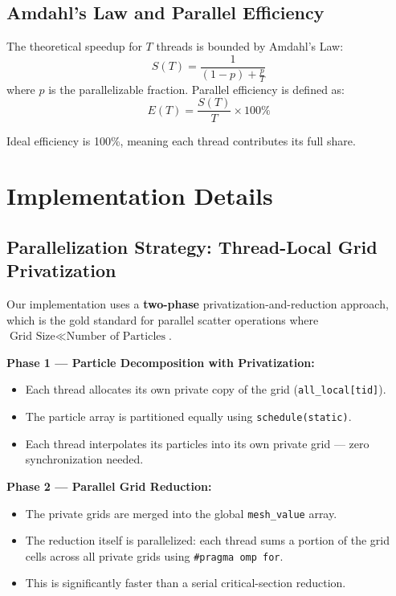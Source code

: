 \documentclass[12pt,a4paper]{article}
\begin{document}
\subsection{Amdahl's Law and Parallel Efficiency}

The theoretical speedup for $T$ threads is bounded by Amdahl's Law:
\[
S(T) = \frac{1}{(1-p) + \frac{p}{T}}
\]
where $p$ is the parallelizable fraction. Parallel efficiency is defined as:
\[
E(T) = \frac{S(T)}{T} \times 100\%
\]

Ideal efficiency is 100\%, meaning each thread contributes its full share.

\section{Implementation Details}

\subsection{Parallelization Strategy: Thread-Local Grid Privatization}

Our implementation uses a \textbf{two-phase} privatization-and-reduction approach, which is the gold standard for parallel scatter operations where $\text{Grid Size} \ll \text{Number of Particles}$.

\textbf{Phase 1 --- Particle Decomposition with Privatization:}
\begin{itemize}
    \item Each thread allocates its own private copy of the grid (\texttt{all\_local[tid]}).
    \item The particle array is partitioned equally using \texttt{schedule(static)}.
    \item Each thread interpolates its particles into its own private grid — zero synchronization needed.
\end{itemize}

\textbf{Phase 2 --- Parallel Grid Reduction:}
\begin{itemize}
    \item The private grids are merged into the global \texttt{mesh\_value} array.
    \item The reduction itself is parallelized: each thread sums a portion of the grid cells across all private grids using \texttt{\#pragma omp for}.
    \item This is significantly faster than a serial critical-section reduction.
\end{itemize}
\end{document}
